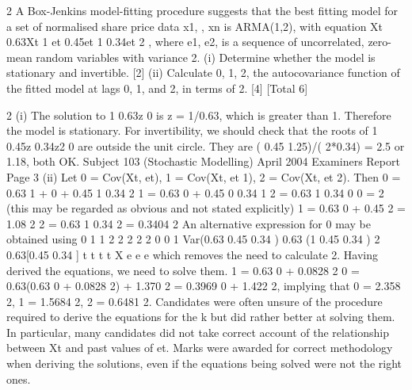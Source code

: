 \documentclass[a4paper,12pt]{article}
\begin{document}
2 A Box-Jenkins model-fitting procedure suggests that the best fitting model for a set of
normalised share price data x1, , xn is ARMA(1,2), with equation
Xt 0.63Xt 1 et 0.45et 1 0.34et 2 ,
where {e1, e2, } is a sequence of uncorrelated, zero-mean random variables with
variance 2.
(i) Determine whether the model is stationary and invertible. [2]
(ii) Calculate 0, 1, 2, the autocovariance function of the fitted model at lags 0, 1,
and 2, in terms of 2. [4]
[Total 6]


2 (i) The solution to 1 0.63z 0 is z = 1/0.63, which is greater than 1. Therefore
the model is stationary.
For invertibility, we should check that the roots of 1 0.45z 0.34z2 0 are
outside the unit circle. They are ( 0.45 1.25)/( 2*0.34) = 2.5 or 1.18, both
OK.
Subject 103 (Stochastic Modelling) April 2004 Examiners Report
Page 3
(ii) Let 0 = Cov(Xt, et), 1 = Cov(Xt, et 1), 2 = Cov(Xt, et 2). Then
0 = 0.63 1 + 0 + 0.45 1 0.34 2
1 = 0.63 0 + 0.45 0 0.34 1
2 = 0.63 1 0.34 0
0 = 2 (this may be regarded as obvious and not stated explicitly)
1 = 0.63 0 + 0.45 2 = 1.08 2
2 = 0.63 1 0.34 2 = 0.3404 2
An alternative expression for 0 may be obtained using
0 1 1 2
2 2 2 2
0 0 1
Var(0.63 0.45 0.34 )
0.63 (1 0.45 0.34 ) 2 0.63[0.45 0.34 ]
t t t t X e e e
which removes the need to calculate 2.
Having derived the equations, we need to solve them.
1 = 0.63 0 + 0.0828 2
0 = 0.63(0.63 0 + 0.0828 2) + 1.370 2 = 0.3969 0 + 1.422 2,
implying that
0 = 2.358 2, 1 = 1.5684 2, 2 = 0.6481 2.
Candidates were often unsure of the procedure required to derive the equations for the k but
did rather better at solving them. In particular, many candidates did not take correct
account of the relationship between Xt and past values of et. Marks were awarded for correct
methodology when deriving the solutions, even if the equations being solved were not the
right ones.
\end{document}
